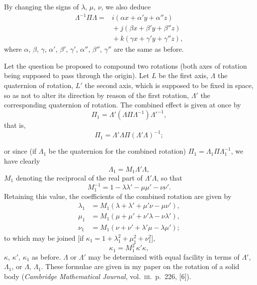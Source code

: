 \documentclass[11pt]{article}
\begin{document}
\medskip

By changing the signs of $\lambda$, $\mu$, $\nu$, we also deduce
\begin{align*}
\Lambda^{-1}\Pi\Lambda = {}&i(\alpha x + \alpha'y + \alpha''z)\\
&{}+ j(\beta x + \beta'y + \beta''z)\\
&{}+ k(\gamma x + \gamma'y + \gamma''z),
\end{align*}
where $\alpha$, $\beta$, $\gamma$, $\alpha'$, $\beta'$, $\gamma'$, $\alpha''$, $\beta''$, $\gamma''$ are the same as before.

\medskip

Let the question be proposed to compound two rotations (both axes of rotation
being supposed to pass through the origin). Let $L$ be the first axis, $\Lambda$ the quaternion
of rotation, $L'$ the second axis, which is supposed to be fixed in space, so as not to
alter its direction by reason of the first rotation, $\Lambda'$ the corresponding quaternion of
rotation. The combined effect is given at once by
\[
\Pi_{1} = \Lambda'(\Lambda\Pi\Lambda^{-1})\Lambda'^{-1},
\]
that is,
\[
\Pi_{1} = \Lambda'\Lambda\Pi(\Lambda'\Lambda)^{-1};
\]

\vfill\pagebreak

or since (if $\Lambda_{1}$ be the quaternion for the combined rotation) $\Pi_{1} = \Lambda_{1}\Pi\Lambda_{1}^{-1}$, we have
clearly
\[
\Lambda_{1} = M_{1}\Lambda'\Lambda,
\]
$M_{1}$ denoting the reciprocal of the real part of $\Lambda'\Lambda$, so that
\[
M_{1}^{-1} = 1 - \lambda\lambda' - \mu\mu' - \nu\nu'.
\]
Retaining this value, the coefficients of the combined rotation are given by
\begin{align*}
\lambda_{1} &= M_{1}(\lambda + \lambda' + \mu'\nu - \mu\nu'),\\
\mu_{1} &= M_{1}(\mu + \mu' + \nu'\lambda - \nu\lambda'),\\
\nu_{1} &= M_{1}(\nu + \nu' + \lambda'\mu - \lambda\mu');
\end{align*}
to which may be joined [if $\kappa_{1} = 1 + \lambda_{1}^{2} + \mu_{1}^{2} + \nu_{1}^{2}$],
\[
\kappa_{1} = M_{1}^{2}\,\kappa'\kappa,
\]
$\kappa$, $\kappa'$, $\kappa_{1}$ as before. $\Lambda$ or $\Lambda'$ may be determined with equal facility in terms of
$\Lambda'$, $\Lambda_{1}$, or $\Lambda$, $\Lambda_{1}$. These formulae are given in my paper on the rotation of a solid
body (\textit{Cambridge Mathematical Journal}, vol.\ \textsc{iii}.\ p.\ 226, [6]).
\end{document}
